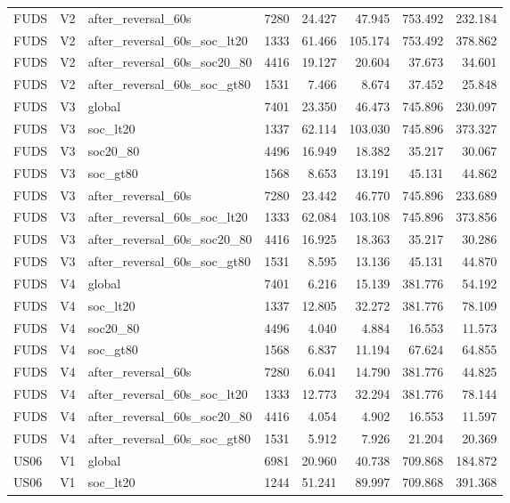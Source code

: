 \begin{tabular}{lllrrrrr}
FUDS & V2 & after\_reversal\_60s & 7280 & 24.427 & 47.945 & 753.492 & 232.184 \\
FUDS & V2 & after\_reversal\_60s\_soc\_lt20 & 1333 & 61.466 & 105.174 & 753.492 & 378.862 \\
FUDS & V2 & after\_reversal\_60s\_soc20\_80 & 4416 & 19.127 & 20.604 & 37.673 & 34.601 \\
FUDS & V2 & after\_reversal\_60s\_soc\_gt80 & 1531 & 7.466 & 8.674 & 37.452 & 25.848 \\
FUDS & V3 & global & 7401 & 23.350 & 46.473 & 745.896 & 230.097 \\
FUDS & V3 & soc\_lt20 & 1337 & 62.114 & 103.030 & 745.896 & 373.327 \\
FUDS & V3 & soc20\_80 & 4496 & 16.949 & 18.382 & 35.217 & 30.067 \\
FUDS & V3 & soc\_gt80 & 1568 & 8.653 & 13.191 & 45.131 & 44.862 \\
FUDS & V3 & after\_reversal\_60s & 7280 & 23.442 & 46.770 & 745.896 & 233.689 \\
FUDS & V3 & after\_reversal\_60s\_soc\_lt20 & 1333 & 62.084 & 103.108 & 745.896 & 373.856 \\
FUDS & V3 & after\_reversal\_60s\_soc20\_80 & 4416 & 16.925 & 18.363 & 35.217 & 30.286 \\
FUDS & V3 & after\_reversal\_60s\_soc\_gt80 & 1531 & 8.595 & 13.136 & 45.131 & 44.870 \\
FUDS & V4 & global & 7401 & 6.216 & 15.139 & 381.776 & 54.192 \\
FUDS & V4 & soc\_lt20 & 1337 & 12.805 & 32.272 & 381.776 & 78.109 \\
FUDS & V4 & soc20\_80 & 4496 & 4.040 & 4.884 & 16.553 & 11.573 \\
FUDS & V4 & soc\_gt80 & 1568 & 6.837 & 11.194 & 67.624 & 64.855 \\
FUDS & V4 & after\_reversal\_60s & 7280 & 6.041 & 14.790 & 381.776 & 44.825 \\
FUDS & V4 & after\_reversal\_60s\_soc\_lt20 & 1333 & 12.773 & 32.294 & 381.776 & 78.144 \\
FUDS & V4 & after\_reversal\_60s\_soc20\_80 & 4416 & 4.054 & 4.902 & 16.553 & 11.597 \\
FUDS & V4 & after\_reversal\_60s\_soc\_gt80 & 1531 & 5.912 & 7.926 & 21.204 & 20.369 \\
US06 & V1 & global & 6981 & 20.960 & 40.738 & 709.868 & 184.872 \\
US06 & V1 & soc\_lt20 & 1244 & 51.241 & 89.997 & 709.868 & 391.368 \\

\end{tabular}
